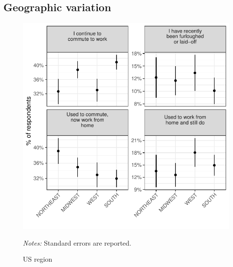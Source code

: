 \documentclass[12pt]{article}
\begin{document}
\subsection{Geographic variation} 

\begin{figure}
  \caption{US region} \label{fig:region}
\centering
\begin{minipage}{1.0 \linewidth}
  \includegraphics[width = \linewidth]{plots/region.pdf} \\
  \begin{footnotesize}
    \begin{singlespace}
      \emph{Notes:} Standard errors are reported. 
    \end{singlespace}
    \end{footnotesize}
\end{minipage}
\end{figure} 
\end{document}
